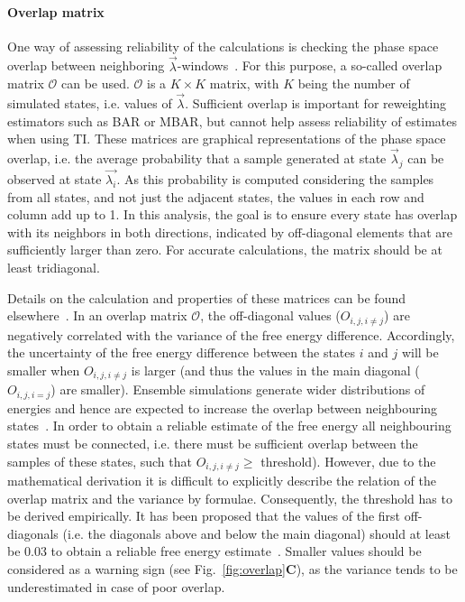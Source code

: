 \documentclass[9pt,bestpractices]{livecoms}
\begin{document}
\paragraph{Overlap matrix}
One way of assessing reliability of the calculations is checking the phase space overlap between neighboring $\vec{\lambda}$-windows~\cite{wu2005phasespace, wu2005phasespacea}. For this purpose, a so-called overlap matrix $\mathcal{O}$ can be used. $\mathcal{O}$ is a $K\times K$ matrix, with $K$ being the number of simulated states, i.e. values of $\vec{\lambda}$. Sufficient overlap is important for reweighting estimators such as BAR or MBAR, but cannot help assess reliability of estimates when using TI. 
These matrices are graphical representations of the phase space overlap, i.e. the average probability that a sample generated at state $\vec{\lambda}_{j}$ can be observed at state $\vec{\lambda_{i}}$. As this probability is computed considering the samples from all states, and not just the adjacent states, the values in each row and column add up to 1. In this analysis, the goal is to ensure every state has overlap with its neighbors in both directions, indicated by off-diagonal elements that are sufficiently larger than zero. For accurate calculations, the matrix should be at least tridiagonal.

Details on the calculation and properties of these matrices can be found elsewhere~\cite{klimovich2015guidelines}.
In an overlap matrix $\mathcal{O}$, the off-diagonal values (${O}_{i,j,i\ne j}$) are negatively correlated with the variance of the free energy difference. Accordingly, the uncertainty of the free energy difference between the states $i$ and $j$ will be smaller when ${O}_{i,j,i\ne j}$ is larger (and thus the values in the main diagonal (${O}_{i,j,i=j}$) are smaller). 
Ensemble simulations generate wider distributions of energies and hence are expected to increase the overlap between neighbouring states~\cite{wade2022}.
In order to obtain a reliable estimate of the free energy all neighbouring states must be connected, i.e. there must be sufficient overlap between the samples of these states, such that ${O}_{i,j,i\ne j}\ge$ threshold).
However, due to the mathematical derivation it is difficult to explicitly describe the relation of the overlap matrix and the variance by formulae. Consequently, the threshold has to be derived empirically. It has been proposed that the values of the first off-diagonals (i.e. the diagonals above and below the main diagonal) should at least be 0.03 to obtain a reliable free energy estimate~\cite{klimovich2015guidelines}. Smaller values should be considered as a warning sign (see Fig.~\ref{fig:overlap}\textbf{C}), as the variance tends to be underestimated in case of poor overlap.
\end{document}
